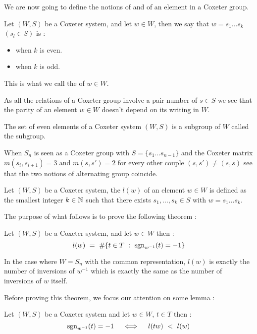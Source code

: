 	We are now going to define the notions of  and  of an element in a Coxeter group.
	\begin{definition}
		Let $(W,S)$ be a Coxeter system, and let $w\in W$, then we say that $w=s_1...s_k$ $(s_l\in S)$ is :
		\begin{itemize}
			\item {} when $k$ is even.
			\item {} when $k$ is odd.
		\end{itemize}
	This is what we call the  of $w\in W$.
	\end{definition}
\begin{remark}
	As all the relations of a Coxeter group involve a pair number of $s\in S$ we see that the parity of an element $w\in W$ doesn't depend on its writing in $W$.
\end{remark}
The set of even elements of a Coxeter system $(W,S)$ is a subgroup of $W$ called the  subgroup.
\begin{remark}
	When $S_n$ is seen as a Coxeter group with $S=\{s_1...s_{n-1}\}$ and the Coxeter matrix $m(s_i,s_{i+1})=3$ and $m(s,s')=2$ for every other couple $(s,s')\not=(s,s)$ see that the two notions of alternating group coincide.
\end{remark}
\begin{definition}
	Let $(W,S)$ be a Coxeter system, the  $l(w)$ of an element $w\in W$ is defined as the smallest integer $k\in \mathbb N$ such that there exists $s_1,...,s_k\in S$ with $w=s_1...s_k$.
\end{definition}
The purpose of what follows is to prove the following theorem :
\begin{theorem}\label{theorem sur le calcul des longueurs}
	Let $(W,S)$ be a Coxeter system, and let $w\in W$ then :
	\begin{equation}
	l(w)\text{ }=\text{ } \#\{t\in T\text{ } :\text{ } \mbox{sgn}_{w^{-1}}(t)=-1\}
	\end{equation}
\end{theorem}
\begin{example}
	In the case where $W=S_n$ with the common representation, $l(w)$ is exactly the number of inversions of $w^{-1}$ which is exactly the same as the number of inversions of $w$ itself.
\end{example}
Before proving this theorem, we focus our attention on some lemma :
\begin{lemma}\label{le lemme de la longueur de tw}
	Let $(W,S)$ be a Coxeter system and let $w\in W$, $t\in T$ then :
	\begin{equation}
	\mbox{sgn}_{w^{-1}}(t)=-1\quad \iff \quad l(tw)\text{ }<\text{ } l(w)
	\end{equation}
\end{lemma}
